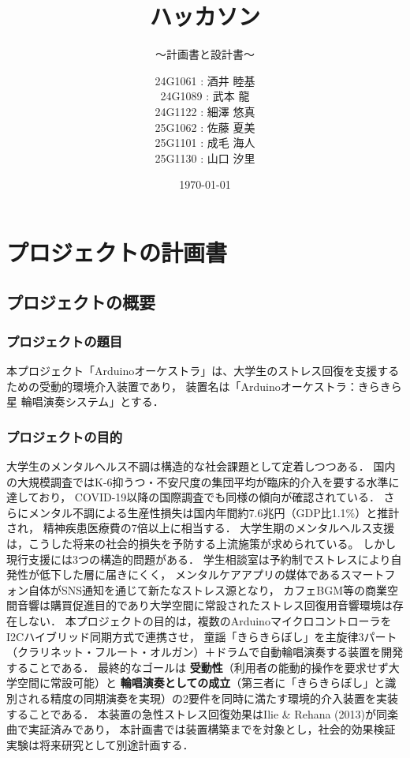 \documentclass[lualatex,book,paper=a4paper,jafontsize=11.5pt,jafontscale=1.05]{jlreq}
\title{ハッカソン}
\subtitle{～計画書と設計書～}
\author{
	      24G1061 : 酒井 睦基 \\
        24G1089 : 武本 龍　 \\
	      24G1122 : 細澤 悠真 \\
        25G1062 : 佐藤 夏美 \\
        25G1101 : 成毛 海人 \\
        25G1130 : 山口 汐里
        }
\date{\today}
\begin{document}
\maketitle

\setcounter{tocdepth}{2}
\tableofcontents \thispagestyle{empty}

\chapter{プロジェクトの計画書} \label{chap:project-plan}\setcounter{page}{1}
\section{プロジェクトの概要}
\subsection{プロジェクトの題目}
本プロジェクト「Arduinoオーケストラ」は、大学生のストレス回復を支援するための受動的環境介入装置であり，
装置名は「Arduinoオーケストラ：きらきら星 輪唱演奏システム」とする．

\subsection{プロジェクトの目的}
大学生のメンタルヘルス不調は構造的な社会課題として定着しつつある．
国内の大規模調査ではK-6抑うつ・不安尺度の集団平均が臨床的介入を要する水準に達しており\cite{ref:tanaka2020}，
COVID-19以降の国際調査でも同様の傾向が確認されている\cite{ref:wathelet2020}．
さらにメンタル不調による生産性損失は国内年間約7.6兆円（GDP比1.1\%）と推計され，
精神疾患医療費の7倍以上に相当する\cite{ref:harada2025}．
大学生期のメンタルヘルス支援は，こうした将来の社会的損失を予防する上流施策が求められている。
しかし現行支援には3つの構造的問題がある．
学生相談室は予約制でストレスにより自発性が低下した層に届きにくく\cite{ref:soudanshitsu}，
メンタルケアアプリの媒体であるスマートフォン自体がSNS通知を通じて新たなストレス源となり\cite{ref:smartphone_stress}，
カフェBGM等の商業空間音響は購買促進目的であり大学空間に常設されたストレス回復用音響環境は存在しない\cite{ref:usen}．
本プロジェクトの目的は，複数のArduinoマイクロコントローラをI2Cハイブリッド同期方式で連携させ，
童謡「きらきらぼし」を主旋律3パート（クラリネット・フルート・オルガン）＋ドラムで自動輪唱演奏する装置を開発することである．
最終的なゴールは
\textbf{受動性}（利用者の能動的操作を要求せず大学空間に常設可能）と
\textbf{輪唱演奏としての成立}（第三者に「きらきらぼし」と識別される精度の同期演奏を実現）の2要件を同時に満たす環境的介入装置を実装することである．
本装置の急性ストレス回復効果はIlie \& Rehana (2013)\cite{ref:ilie2013}が同楽曲で実証済みであり，
本計画書では装置構築までを対象とし，社会的効果検証実験は将来研究として別途計画する．
\end{document}
